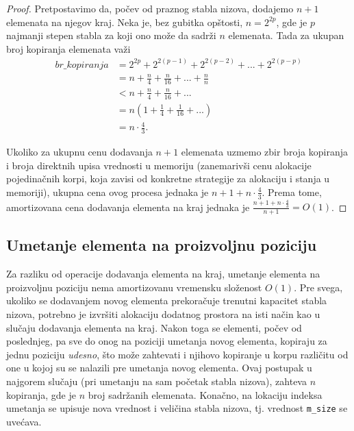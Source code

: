 \documentclass[a4paper]{article}
\begin{document}
\begin{proof}
Pretpostavimo da, počev od praznog stabla nizova, dodajemo $n + 1$ elemenata na njegov kraj. Neka je, bez gubitka opštosti, $n = 2^{2p}$, gde je $p$ najmanji stepen stabla za koji ono može da sadrži $n$ elemenata. Tada za ukupan broj kopiranja elemenata važi
\begin{equation}
\begin{split}
    br\_kopiranja &= 2^{2p} + 2^{2(p - 1)} + 2^{2(p - 2)} + ... + 2^{2(p - p)} \\
    &= n + \frac{n}{4} + \frac{n}{16} + ... + \frac{n}{n} \\
    &< n + \frac{n}{4} + \frac{n}{16} + ... \\
    &= n(1 + \frac{1}{4} + \frac{1}{16} + ...) \\
    &= n \cdot \frac{4}{3}.
\end{split}
\end{equation}

Ukoliko za ukupnu cenu dodavanja $n + 1$ elemenata uzmemo zbir broja kopiranja i broja direktnih upisa vrednosti u memoriju (zanemarivši cenu alokacije pojedinačnih korpi, koja zavisi od konkretne strategije za alokaciju i stanja u memoriji), ukupna cena ovog procesa jednaka je $n + 1 + n \cdot \frac{4}{3}$. Prema tome, amortizovana cena dodavanja elementa na kraj jednaka je $\frac{n + 1 + n \cdot \frac{4}{3}}{n + 1} = O(1)$.
\end{proof}

\subsection{Umetanje elementa na proizvoljnu poziciju}

Za razliku od operacije dodavanja elementa na kraj, umetanje elementa na proizvoljnu poziciju nema amortizovanu vremensku složenost $O(1)$. Pre svega, ukoliko se dodavanjem novog elementa prekoračuje trenutni kapacitet stabla nizova, potrebno je izvršiti alokaciju dodatnog prostora na isti način kao u slučaju dodavanja elementa na kraj. Nakon toga se elementi, počev od poslednjeg, pa sve do onog na poziciji umetanja novog elementa, kopiraju za jednu poziciju \textit{udesno}, što može zahtevati i njihovo kopiranje u korpu različitu od one u kojoj su se nalazili pre umetanja novog elementa. Ovaj postupak u najgorem slučaju (pri umetanju na sam početak stabla nizova), zahteva $n$ kopiranja, gde je $n$ broj sadržanih elemenata. Konačno, na lokaciju indeksa umetanja se upisuje nova vrednost i veličina stabla nizova, tj. vrednost \verb|m_size| se uvećava.
\end{document}
